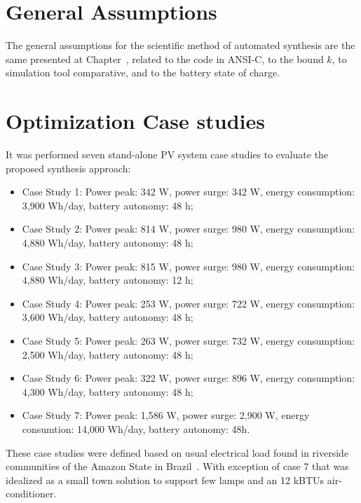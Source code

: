 \section{General Assumptions}

The general assumptions for the scientific method of automated synthesis are the same presented at Chapter~, related to the code in ANSI-C, to the bound $k$, to simulation tool comparative, and to the battery state of charge.

\section{Optimization Case studies} 

It was performed seven stand-alone PV system case studies to evaluate the proposed synthesis approach: 

\begin{itemize}
\item Case Study 1: Power peak: 342 W, power surge: 342 W, energy consumption: 3,900 Wh/day, battery autonomy: 48 h;
\item Case Study 2: Power peak: 814 W, power surge: 980 W, energy consumption: 4,880 Wh/day, battery autonomy: 48 h;
\item Case Study 3: Power peak: 815 W, power surge: 980 W, energy consumption: 4,880 Wh/day, battery autonomy: 12 h;
\item Case Study 4: Power peak: 253 W, power surge: 722 W, energy consumption: 3,600 Wh/day, battery autonomy: 48 h;
\item Case Study 5: Power peak: 263 W, power surge: 732 W, energy consumption: 2,500 Wh/day, battery autonomy: 48 h;
\item Case Study 6: Power peak: 322 W, power surge: 896 W, energy consumption: 4,300 Wh/day, battery autonomy: 48 h;
\item Case Study 7: Power peak: 1,586 W, power surge: 2,900 W, energy consumtion: 14,000 Wh/day, battery autonomy: 48h.
\end{itemize}

These case studies were defined based on usual electrical load found in riverside communities of the Amazon State in Brazil~\cite{abs-1811-09438, Agrener2013}. With exception of case 7 that was idealized as a small town solution to support few lamps and an 12 kBTUs air-conditioner.

